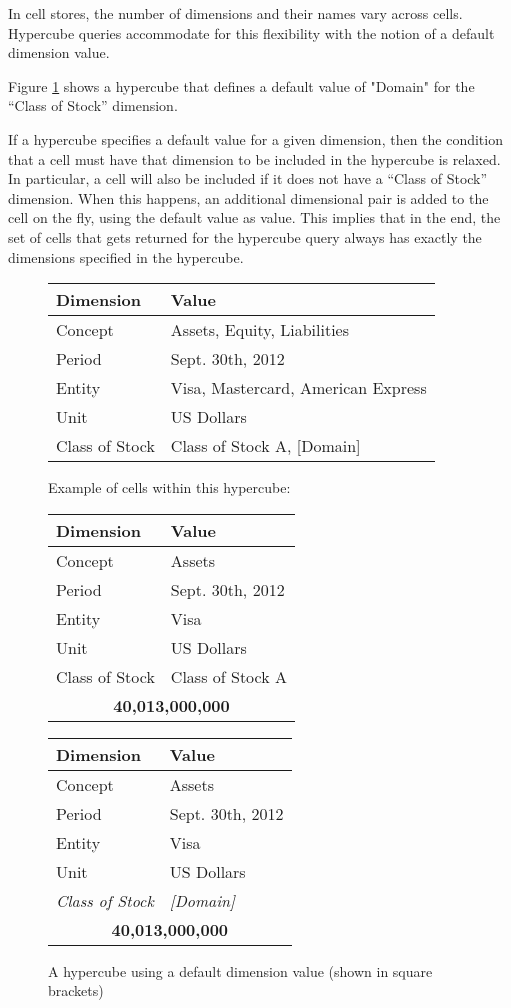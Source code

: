 \documentclass{vldb}
\begin{document}
In cell stores, the number of dimensions and their names vary across cells. Hypercube queries accommodate for this flexibility with the notion of a default dimension value.

Figure \ref{fig-default} shows a hypercube that defines a default value of "Domain" for the ``Class of Stock'' dimension.

If a hypercube specifies a default value for a given dimension, then the condition that a cell must have that dimension to be included in the hypercube is relaxed. In particular, a cell will also be included if it does not have a ``Class of Stock'' dimension. When this happens, an additional dimensional pair is added to the cell on the fly, using the default value as value. This implies that in the end, the set of cells that gets returned for the hypercube query always has exactly the dimensions specified in the hypercube.

\begin{figure}
\caption{A hypercube using a default dimension value (shown in square brackets)}
\label{fig-default}
\begin{tabular}{|l|l|}
\hline
Dimension & Value \\
\hline
Concept & Assets, Equity, Liabilities \\
Period & Sept. 30th, 2012 \\
Entity & Visa, Mastercard, American Express \\
Unit & US Dollars \\
Class of Stock & Class of Stock A, [Domain] \\
\hline
\end{tabular}

Example of cells within this hypercube:

\begin{tabular}{|l|l|}
\hline
Dimension & Value \\
\hline
Concept & Assets \\
Period & Sept. 30th, 2012 \\
Entity & Visa \\
Unit & US Dollars \\
Class of Stock & Class of Stock A \\
\hline
\multicolumn{2}{|c|}{\textbf{40,013,000,000}} \\
\hline
\end{tabular}

\begin{tabular}{|l|l|}
\hline
Dimension & Value \\
\hline
Concept & Assets \\
Period & Sept. 30th, 2012 \\
Entity & Visa \\
Unit & US Dollars \\
\emph{Class of Stock} & \emph{[Domain]} \\
\hline
\multicolumn{2}{|c|}{\textbf{40,013,000,000}} \\
\hline
\end{tabular}
\end{figure}
\end{document}
